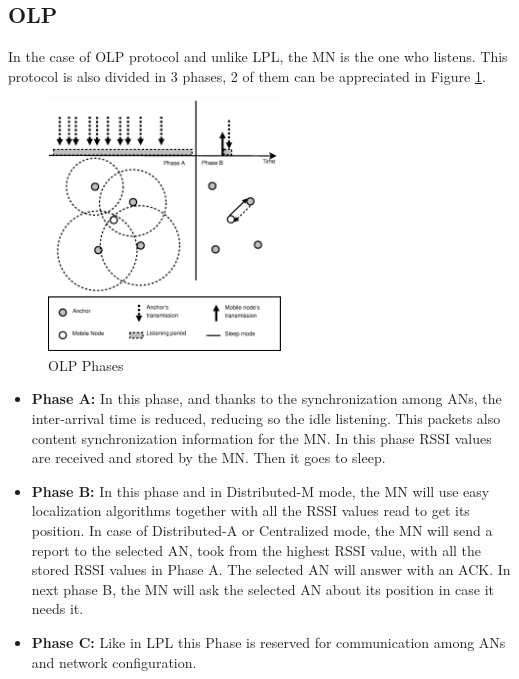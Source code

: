 \subsection{\acl{OLP}}

In the case of \ac{OLP} protocol and unlike \ac{LPL}, the \ac{MN} is the one who listens. This protocol is also divided in 3 phases, 2 of 
them can be appreciated in Figure \ref{fig:OLP}.

\begin{figure}[ht]
 \begin{center}
  \includegraphics[width=0.55\textwidth]{OLP.eps}
 \end{center}
 \caption{OLP Phases \cite{LPLandOLP}}
 \label{fig:OLP}
\end{figure}

\begin{itemize}
 \item \textbf{Phase A:} In this phase, and thanks to the synchronization among \acp{AN}, the inter-arrival time is reduced, reducing so the
idle listening. This packets also content synchronization information for the \ac{MN}. In this phase \ac{RSSI} values are received and stored
by the \ac{MN}. Then it goes to sleep.
 \item \textbf{Phase B:} In this phase and in Distributed-M mode, the \ac{MN} will use easy localization algorithms together with all the \ac{RSSI}
values read to get its position. In case of Distributed-A or Centralized mode, the \ac{MN} will send a report to the selected \ac{AN}, took 
from the highest \ac{RSSI} value, with all the stored \ac{RSSI} values in Phase A. The selected \ac{AN} will answer with an \ac{ACK}. In next
phase B, the \ac{MN} will ask the selected \ac{AN} about its position in case it needs it.
 \item \textbf{Phase C:} Like in \ac{LPL} this Phase is reserved for communication among \acp{AN} and network configuration.
\end{itemize}

